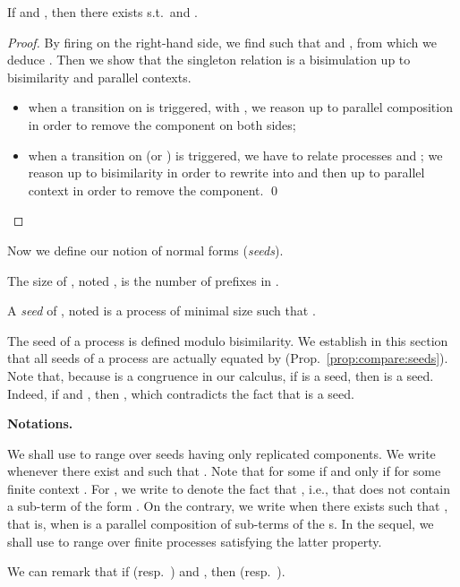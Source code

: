 \documentclass{llncs}
\begin{document}
\begin{lem}\label{lem:pouslemma}
  If  and , then there
  exists  s.t.\  and .
\end{lem}
\begin{proof}
  By firing  on the right-hand side, we find  such that
   and , from which we
  deduce . Then we show that the singleton
  relation  is a
  bisimulation up to bisimilarity and parallel contexts.
  \begin{itemize}
  \item when a transition on  is triggered, with ,
    we reason up to parallel composition in order to remove the 
    component on both sides;
  \item when a transition on  (or ) is triggered, we
    have to relate processes  and
     ; we reason up to
    bisimilarity in order to rewrite  into  and then
    up to parallel context in order to remove the  component. \qed
  \end{itemize}
\end{proof}

\medskip

Now we define our notion of normal forms (\emph{seeds}).
\begin{defi} The size of , noted , is the number of prefixes in .

  A \emph{seed} of , noted  is a process of minimal size
  such that .
\end{defi}

The seed of a process is defined modulo bisimilarity. We establish in
this section that all seeds of a process are actually equated by
\eqD{} (Prop.~\ref{prop:compare:seeds}).  Note that, because  is
a congruence in our calculus, if  is a seed, then  is a
seed. Indeed, if  and , then
, which contradicts the fact that  is a
seed.

\medskip
\noindent \textbf{Notations.} 

We shall use  to range over seeds having only replicated
components.
We write  whenever there exist 
and  such that .
Note that  for some  if and only if
 for some finite context .
For , we write  to denote the
fact that , i.e., that
 does not contain a sub-term of the form . On the
contrary, we write  when there exists  such that
, that is, when  is a parallel composition of
sub-terms of the s. In the sequel, we shall use  to range over
finite processes satisfying the latter property.

We can remark that if  (resp.\ ) and , then  (resp.\ ).  
\end{document}
